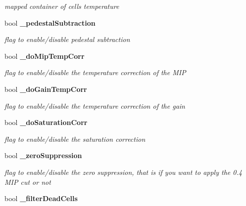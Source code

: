 \begin{DoxyCompactItemize}
\begin{DoxyCompactList}\small\item\em mapped container of cells temperature \item\end{DoxyCompactList}\item 
bool {\bf \_\-pedestalSubtraction}\label{classCALICE_1_1SiPMCalibrateProcessor_a62cbf93050afc1ee6e5c7f82fd1f3e66}

\begin{DoxyCompactList}\small\item\em flag to enable/disable pedestal subtraction \item\end{DoxyCompactList}\item 
bool {\bf \_\-doMipTempCorr}\label{classCALICE_1_1SiPMCalibrateProcessor_ae71be6f56269b829919d429f1a85e3f8}

\begin{DoxyCompactList}\small\item\em flag to enable/disable the temperature correction of the MIP \item\end{DoxyCompactList}\item 
bool {\bf \_\-doGainTempCorr}\label{classCALICE_1_1SiPMCalibrateProcessor_a2228aa6db6d857d46ce8309bfa4e7026}

\begin{DoxyCompactList}\small\item\em flag to enable/disable the temperature correction of the gain \item\end{DoxyCompactList}\item 
bool {\bf \_\-doSaturationCorr}\label{classCALICE_1_1SiPMCalibrateProcessor_adda23df94c9acdcc5374d17bb956dfcc}

\begin{DoxyCompactList}\small\item\em flag to enable/disable the saturation correction \item\end{DoxyCompactList}\item 
bool {\bf \_\-zeroSuppression}\label{classCALICE_1_1SiPMCalibrateProcessor_a1c5afe234b4e0f55c2da524153dbd2ff}

\begin{DoxyCompactList}\small\item\em flag to enable/disable the zero suppression, that is if you want to apply the 0.4 MIP cut or not \item\end{DoxyCompactList}\item 
bool {\bf \_\-filterDeadCells}\label{classCALICE_1_1SiPMCalibrateProcessor_a12a78cade56b09367209139fac783c14}


\end{DoxyCompactItemize}
